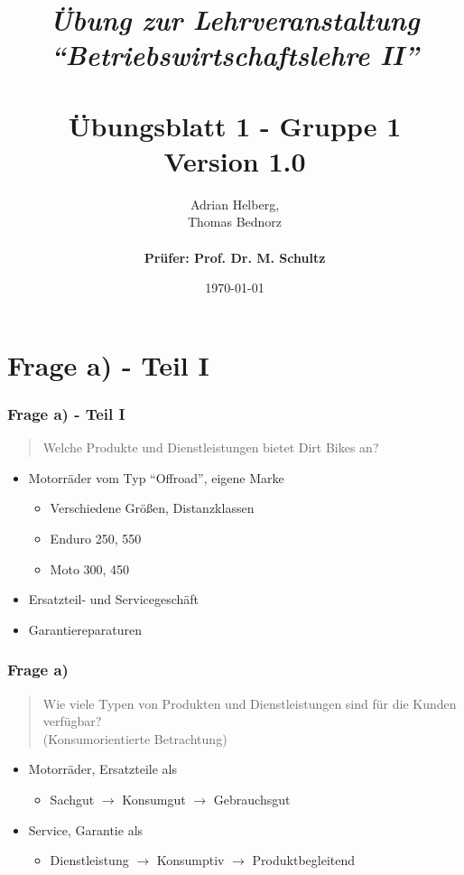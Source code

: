 \documentclass{beamer}
\title{
	\textit{\"Ubung zur Lehrveranstaltung ``Betriebswirtschaftslehre II''} \\
	\textbf{\\ \"Ubungsblatt 1 - Gruppe 1} \\
	\scriptsize{Version 1.0}
}
\author{Adrian Helberg, \\ Thomas Bednorz \\\textbf{\\ Prüfer: Prof. Dr. M. Schultz}}
\date{\today}
\begin{document}

\maketitle

\frame{\tableofcontents}

\section{Frage a) - Teil I}
\begin{frame}
\frametitle{Frage a) - Teil I}

\begin{quote}
Welche Produkte und Dienstleistungen bietet Dirt Bikes an? 
\end{quote}

\begin{itemize}
\setlength{\itemsep}{20pt}
\item Motorr\"ader vom Typ ``Offroad'', eigene Marke
\begin{itemize}
\item Verschiedene Gr\"oßen, Distanzklassen
\item Enduro 250, 550
\item Moto 300, 450
\end{itemize}
\item Ersatzteil- und Servicegesch\"aft
\item Garantiereparaturen
\end{itemize}

\end{frame}

\begin{frame}
\frametitle{Frage a)}

\begin{quote}
Wie viele Typen von Produkten und Dienstleistungen sind für die Kunden verfügbar? \\
(Konsumorientierte Betrachtung)
\end{quote}

\begin{itemize}
\setlength{\itemsep}{12pt}
\item Motorräder, Ersatzteile als
\begin{itemize}
\item Sachgut $\rightarrow$ Konsumgut $\rightarrow$ Gebrauchsgut
\end{itemize}
\item Service, Garantie als
\begin{itemize}
\item Dienstleistung $\rightarrow$ Konsumptiv $\rightarrow$ Produktbegleitend
\end{itemize}
\end{itemize}

\end{frame}
\end{document}
